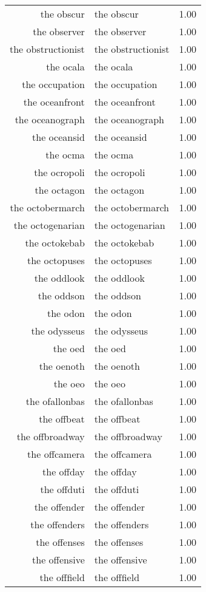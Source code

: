 \begin{table}[ht]
\begin{tabular}{rlr}
  the obscur & the obscur & 1.00 \\ 
  the observer & the observer & 1.00 \\ 
  the obstructionist & the obstructionist & 1.00 \\ 
  the ocala & the ocala & 1.00 \\ 
  the occupation & the occupation & 1.00 \\ 
  the oceanfront & the oceanfront & 1.00 \\ 
  the oceanograph & the oceanograph & 1.00 \\ 
  the oceansid & the oceansid & 1.00 \\ 
  the ocma & the ocma & 1.00 \\ 
  the ocropoli & the ocropoli & 1.00 \\ 
  the octagon & the octagon & 1.00 \\ 
  the octobermarch & the octobermarch & 1.00 \\ 
  the octogenarian & the octogenarian & 1.00 \\ 
  the octokebab & the octokebab & 1.00 \\ 
  the octopuses & the octopuses & 1.00 \\ 
  the oddlook & the oddlook & 1.00 \\ 
  the oddson & the oddson & 1.00 \\ 
  the odon & the odon & 1.00 \\ 
  the odysseus & the odysseus & 1.00 \\ 
  the oed & the oed & 1.00 \\ 
  the oenoth & the oenoth & 1.00 \\ 
  the oeo & the oeo & 1.00 \\ 
  the ofallonbas & the ofallonbas & 1.00 \\ 
  the offbeat & the offbeat & 1.00 \\ 
  the offbroadway & the offbroadway & 1.00 \\ 
  the offcamera & the offcamera & 1.00 \\ 
  the offday & the offday & 1.00 \\ 
  the offduti & the offduti & 1.00 \\ 
  the offender & the offender & 1.00 \\ 
  the offenders & the offenders & 1.00 \\ 
  the offenses & the offenses & 1.00 \\ 
  the offensive & the offensive & 1.00 \\ 
  the offfield & the offfield & 1.00 \\ 

\end{tabular}
\end{table}
